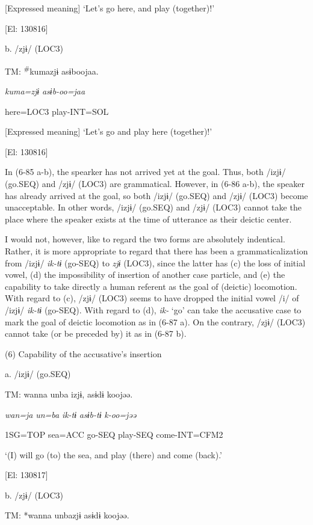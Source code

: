       [Expressed meaning] ‘Let’s go here, and play (together)!’

    [El: 130816]

  b.  /zjɨ/ (LOC3)

    TM:  \textsuperscript{\#}kumazjɨ  asɨboojaa.

      \textit{kuma=zjɨ}  \textit{asɨb-oo=jaa}

      here=LOC3  play-INT=SOL

      [Expressed meaning] ‘Let’s go and play here (together)!’

    [El: 130816]

In (6-85 a-b), the spearker has not arrived yet at the goal. Thus, both /izjɨ/ (go.SEQ) and /zjɨ/ (LOC3) are grammatical. However, in (6-86 a-b), the speaker has already arrived at the goal, so both /izjɨ/ (go.SEQ) and /zjɨ/ (LOC3) become unacceptable. In other words, /izjɨ/ (go.SEQ) and /zjɨ/ (LOC3) cannot take the place where the speaker exists at the time of utterance as their deictic center.

  I would not, however, like to regard the two forms are absolutely indentical. Rather, it is more appropriate to regard that there has been a grammaticalization from /izjɨ/ \textit{ik-tɨ} (go-SEQ) to \textit{zjɨ} (LOC3), since the latter has (c) the loss of initial vowel, (d) the impossibility of insertion of another case particle, and (e) the capability to take directly a human referent as the goal of (deictic) locomotion. With regard to (c), /zjɨ/ (LOC3) seems to have dropped the initial vowel /i/ of /izjɨ/ \textit{ik-tɨ} (go-SEQ). With regard to (d), \textit{ik-} ‘go’ can take the accusative case to mark the goal of deictic locomotion as in (6-87 a). On the contrary, /zjɨ/ (LOC3) cannot take (or be preceded by) it as in (6-87 b).

(6)  Capability of the accusative’s insertion

  a.  /izjɨ/ (go.SEQ)

    TM:  wanna  unba  izjɨ,  asɨdɨ  koojəə.

      \textit{wan=ja}  \textit{un=ba}  \textit{ik-tɨ}  \textit{asɨb-tɨ}  \textit{k-oo=jəə}

      1SG=TOP  sea=ACC  go-SEQ  play-SEQ  come-INT=CFM2

      ‘(I) will go (to) the sea, and play (there) and come (back).’

    [El: 130817]

  b.  /zjɨ/ (LOC3)

    TM:  *wanna  unbazjɨ  asɨdɨ  koojəə.

